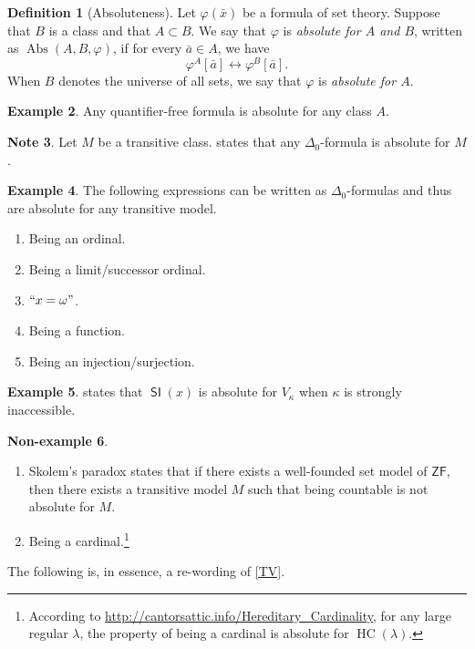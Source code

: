\documentclass[10pt,letterpaper,cm]{nupset}
\theoremstyle{definition}
\newtheorem{definition}{Definition}[subsection]
\newtheorem{exmp}[definition]{Example}
\newtheorem{non-exmp}[definition]{Non-example}
\newtheorem{note}[definition]{Note}
\theoremstyle{theorem}
\theoremstyle{remark}
\newcommand{\1}{\mathbf{1}}
\newcommand{\0}{\vec 0}
\newcommand{\zf}{\mathsf{ZF}}
\DeclareMathOperator{\abs}{Abs}
\DeclareMathOperator{\si}{\mathsf{SI}}
\DeclareMathOperator{\hc}{HC}
\newcommand{\be}{\begin{enumerate}}
\newcommand{\ee}{\end{enumerate}}
\begin{document}
\begin{definition}[Absoluteness] Let $\varphi(\bar{x})$ be a formula of set theory. Suppose that $B$ is a class and that $A\subset B$. We say that $\varphi$ is \textit{absolute for $A$ and $B$}, written as $\abs(A,B, \varphi)$, if for every $\bar{a}\in A$, we have $$\varphi^A[\bar{a}] \leftrightarrow \varphi^B[\bar{a}].$$ When $B$ denotes the universe of all sets, we say that $\varphi$ is \textit{absolute for $A$}.
\end{definition}

\begin{exmp}
Any quantifier-free formula is  absolute for any class $A$.
\end{exmp}

\begin{note}
Let $M$ be a transitive class.  states that any $\Delta_0$-formula is absolute for $M$.
\end{note}

\begin{exmp}\label{d0} The following expressions can be written as $\Delta_0$-formulas and thus are absolute for any transitive model. 
\be
\item Being an ordinal.
\item Being a limit/successor ordinal.
\item $``x=\omega"$.
\item Being a function.
\item Being an injection/surjection.
\ee
\end{exmp}

\begin{exmp}
 states that $\si(x)$ is absolute for $V_{\kappa}$ when $\kappa$ is strongly inaccessible.
\end{exmp}

\begin{non-exmp} $ $
\be
\item Skolem's paradox states that if there exists a well-founded set model of $\zf$, then there exists a transitive model $M$ such that being countable is not absolute for $M$.
\item Being a cardinal.\footnote{According to \url{http://cantorsattic.info/Hereditary_Cardinality}, for any large regular $\lambda$, the property of being a cardinal is absolute for $\hc(\lambda)$.}
\ee
\end{non-exmp}

\smallskip

The following is, in essence, a re-wording of \cref{TV}.
\end{document}
